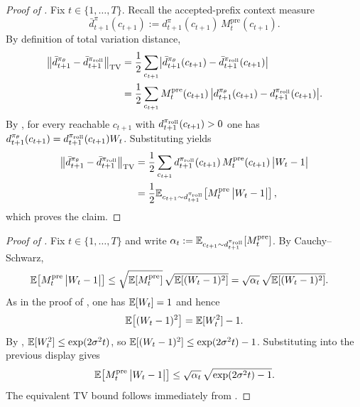 \begin{proof}[Proof of ]
Fix $t\in\{1,\ldots,T\}$. Recall the accepted-prefix context measure
\begin{equation*}
    \bar{d}_{t+1}^{\pi}(c_{t+1}) := d_{t+1}^{\pi}(c_{t+1})\,M_t^{\mathrm{pre}}(c_{t+1}).
\end{equation*}
By definition of total variation distance,
\begin{align*}
    \bigl\|\bar{d}_{t+1}^{\pi_{\theta}} - \bar{d}_{t+1}^{\pi_{\mathrm{roll}}}\bigr\|_{\mathrm{TV}}
    &=
    \frac{1}{2}\sum_{c_{t+1}} \bigl|\bar{d}_{t+1}^{\pi_{\theta}}(c_{t+1}) - \bar{d}_{t+1}^{\pi_{\mathrm{roll}}}(c_{t+1})\bigr|
    \\
    &=
    \frac{1}{2}\sum_{c_{t+1}} M_t^{\mathrm{pre}}(c_{t+1})\,\bigl|d_{t+1}^{\pi_{\theta}}(c_{t+1}) - d_{t+1}^{\pi_{\mathrm{roll}}}(c_{t+1})\bigr|.
\end{align*}
By , for every reachable $c_{t+1}$ with $d_{t+1}^{\pi_{\mathrm{roll}}}(c_{t+1})>0$ one has
$d_{t+1}^{\pi_{\theta}}(c_{t+1})=d_{t+1}^{\pi_{\mathrm{roll}}}(c_{t+1})W_t$. Substituting yields
\begin{align*}
    \bigl\|\bar{d}_{t+1}^{\pi_{\theta}} - \bar{d}_{t+1}^{\pi_{\mathrm{roll}}}\bigr\|_{\mathrm{TV}}
    &=
    \frac{1}{2}\sum_{c_{t+1}} d_{t+1}^{\pi_{\mathrm{roll}}}(c_{t+1})\,M_t^{\mathrm{pre}}(c_{t+1})\,\bigl|W_t-1\bigr|
    \\
    &=
    \frac{1}{2}\mathbb{E}_{c_{t+1}\sim d_{t+1}^{\pi_{\mathrm{roll}}}}\!\left[M_t^{\mathrm{pre}}\,\bigl|W_t-1\bigr|\right],
\end{align*}
which proves the claim.
\end{proof}

\begin{proof}[Proof of ]
Fix $t\in\{1,\ldots,T\}$ and write $\alpha_t := \mathbb{E}_{c_{t+1}\sim d_{t+1}^{\pi_{\mathrm{roll}}}}\!\left[M_t^{\mathrm{pre}}\right]$. By
Cauchy--Schwarz,
\begin{align*}
    \mathbb{E}\!\left[M_t^{\mathrm{pre}}\,\bigl|W_t-1\bigr|\right]
    &\le
    \sqrt{\mathbb{E}\!\left[M_t^{\mathrm{pre}}\right]}\,\sqrt{\mathbb{E}\!\left[(W_t-1)^2\right]}
    =
    \sqrt{\alpha_t}\,\sqrt{\mathbb{E}\!\left[(W_t-1)^2\right]}.
\end{align*}
As in the proof of , one has $\mathbb{E}[W_t]=1$ and hence
\begin{equation*}
    \mathbb{E}\!\left[(W_t-1)^2\right]
    =
    \mathbb{E}[W_t^2] - 1.
\end{equation*}
By , $\mathbb{E}[W_t^2]\le \exp(2\sigma^2 t)$, so $\mathbb{E}[(W_t-1)^2]\le \exp(2\sigma^2 t)-1$.
Substituting into the previous display gives
\begin{equation*}
    \mathbb{E}\!\left[M_t^{\mathrm{pre}}\,\bigl|W_t-1\bigr|\right]
    \le
    \sqrt{\alpha_t}\,\sqrt{\exp(2\sigma^2 t)-1}.
\end{equation*}
The equivalent TV bound follows immediately from .
\end{proof}

